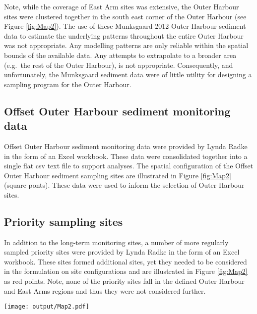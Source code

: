 \documentclass[a4paper]{article}
\let\origfigure=\figure
\let\endorigfigure=\endfigure
\renewenvironment{figure}[1][]{%
   \origfigure[H]
}{%
   \endorigfigure
}
\begin{document}
Note, while the coverage of East Arm sites was extensive, the Outer
Harbour sites were clustered together in the south east corner of the
Outer Harbour (see Figure \ref{fig:Map2}). The use of these Munksgaard
2012 Outer Harbour sediment data to estimate the underlying patterns
throughout the entire Outer Harbour was not appropriate. Any modelling
patterns are only reliable within the spatial bounds of the available
data. Any attempts to extrapolate to a broader area (e.g.~the rest of
the Outer Harbour), is not appropriate. Consequently, and unfortunately,
the Munksgaard sediment data were of little utility for designing a
sampling program for the Outer Harbour.

\hypertarget{offset-outer-harbour-sediment-monitoring-data}{%
\subsection{Offset Outer Harbour sediment monitoring
data}\label{offset-outer-harbour-sediment-monitoring-data}}

Offset Outer Harbour sediment monitoring data were provided by Lynda
Radke in the form of an Excel workbook. These data were consolidated
together into a single flat csv text file to support analyses. The
spatial configuration of the Offset Outer Harbour sediment sampling
sites are illustrated in Figure \ref{fig:Map2} (square ponts). These
data were used to inform the selection of Outer Harbour sites.

\hypertarget{priority-sampling-sites}{%
\subsection{Priority sampling sites}\label{priority-sampling-sites}}

In addition to the long-term monitoring sites, a number of more
regularly sampled priority sites were provided by Lynda Radke in the
form of an Excel workbook. These sites formed additional sites, yet they
needed to be considered in the formulation on site configurations and
are illustrated in Figure \ref{fig:Map2} as red points. Note, none of
the priority sites fall in the defined Outer Harbour and East Arms
regions and thus they were not considered further.

\begin{figure}
\centering\scriptsize
\texttt{[image: output/Map2.pdf]}
\caption{Map of Darwin Harbour indicating the spatial configuration of
Munksgaard 2012 sediment monitoring sites (dots). Solid dots signify
sites within the Outer Harbour and East Arm focal areas. Black circular
points represent Munksgaard 2012 sediment sampling sites, square points
represent Offset Outer Harbour sediment sites and red points represent
priority sites.\label{fig:Map2}}
\end{figure}
\end{document}
